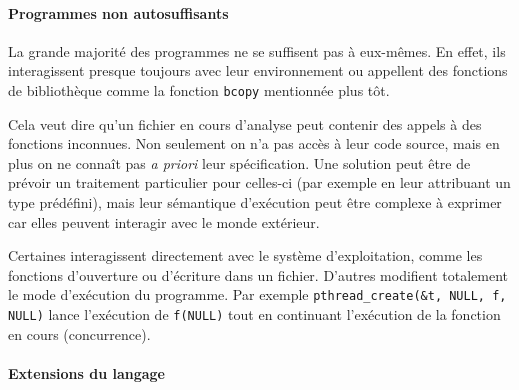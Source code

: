 
\paragraph{Programmes non autosuffisants}

La grande majorité des programmes ne se suffisent pas à eux-mêmes. En effet, ils
interagissent presque toujours avec leur environnement ou appellent des
fonctions de bibliothèque comme la fonction \texttt{bcopy} mentionnée plus tôt.

Cela veut dire qu'un fichier en cours d'analyse peut contenir des appels à des
fonctions inconnues. Non seulement on n'a pas accès à leur code source, mais en
plus on ne connaît pas \emph{a priori} leur spécification. Une solution peut
être de prévoir un traitement particulier pour celles-ci (par exemple en leur
attribuant un type prédéfini), mais leur sémantique d'exécution peut être
complexe à exprimer car elles peuvent interagir avec le monde extérieur.

Certaines interagissent directement avec le système d'exploitation, comme les
fonctions d'ouverture ou d'écriture dans un fichier. D'autres modifient
totalement le mode d'exécution du programme. Par exemple
\texttt{pthread\_create(\&t, NULL, f, NULL)} lance l'exécution de
\texttt{f(NULL)} tout en continuant l'exécution de la fonction en cours
(concurrence).

\paragraph{Extensions du langage}

